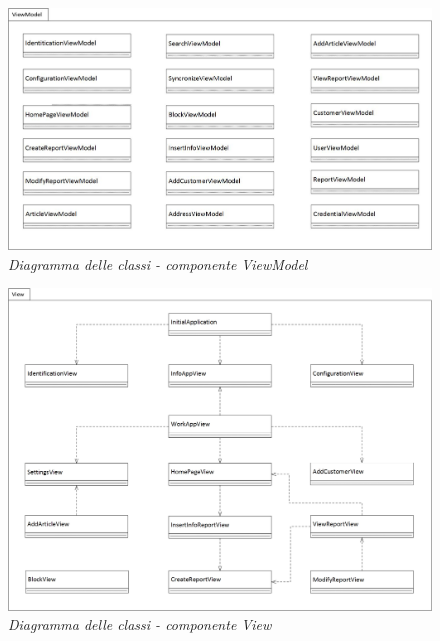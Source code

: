 	\begin{figure}[ht]
		\centering
		\includegraphics[scale=0.35]{immagini/progettazione/plainrap_viewmodel.jpg}
		\caption{\textit{Diagramma delle classi - componente ViewModel}}
	\end{figure}\FloatBarrier
	
	\begin{figure}[ht]
		\centering
		\includegraphics[scale=0.32]{immagini/progettazione/plainrap_view.jpg}
		\caption{\textit{Diagramma delle classi - componente View}}
	\end{figure}\FloatBarrier